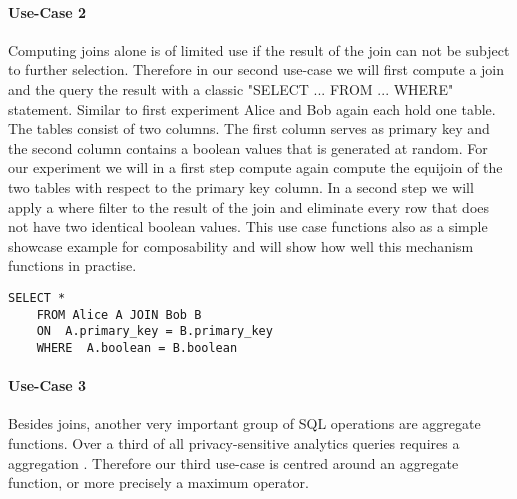\paragraph{Use-Case 2}
Computing joins alone is of limited use if the result of the join can not be subject to further selection. Therefore in our second use-case we will first compute a join and the query the result with a classic "SELECT ... FROM ... WHERE" statement. Similar to first experiment Alice and Bob again each hold one table. The tables consist of two columns. The first column serves as primary key and the second column contains a boolean values that is generated at random. For our experiment we will in a first step compute again compute the equijoin of the two tables with respect to the primary key column. In a second step we will apply a where filter to the result of the join and eliminate every row that does not have two identical boolean values. This use case functions also as a simple showcase example for composability and will show how well this mechanism functions in practise.   
\begin{lstlisting}[caption={Functional equivalent SQL statement for our second use-case}]
	SELECT * 
	FROM Alice A JOIN Bob B 
	ON  A.primary_key = B.primary_key
	WHERE  A.boolean = B.boolean 
\end{lstlisting}
\paragraph{Use-Case 3}
Besides joins, another very important group of SQL operations are aggregate functions. Over a third of all privacy-sensitive analytics queries requires a aggregation \cite{johnson2017practical}. Therefore our third use-case is centred around an aggregate function, or more precisely a maximum operator. 
 

